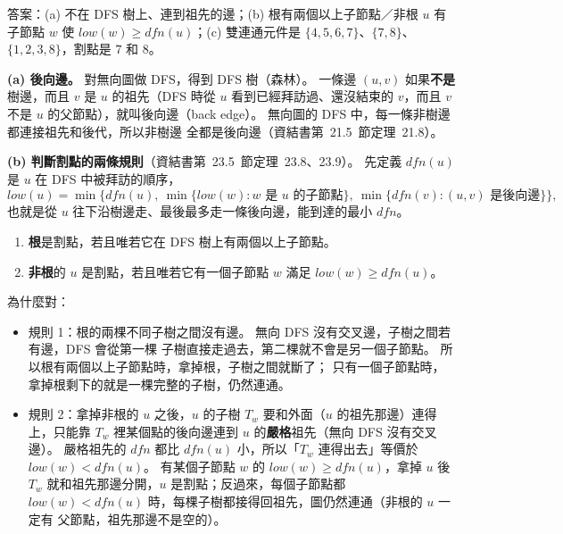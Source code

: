 \begin{pastsoln}
答案：(a) 不在 DFS 樹上、連到祖先的邊；(b) 根有兩個以上子節點／非根 $u$ 有子節點 $w$ 使
$\mathit{low}(w) \ge \mathit{dfn}(u)$；(c) 雙連通元件是 $\{4, 5, 6, 7\}$、$\{7, 8\}$、
$\{1, 2, 3, 8\}$，割點是 $7$ 和 $8$。

\textbf{(a) 後向邊。} 對無向圖做 DFS，得到 DFS 樹（森林）。 一條邊 $(u, v)$ 如果\textbf{不是}
樹邊，而且 $v$ 是 $u$ 的祖先（DFS 時從 $u$ 看到已經拜訪過、還沒結束的 $v$，而且 $v$ 不是 $u$
的父節點），就叫後向邊（back edge）。 無向圖的 DFS 中，每一條非樹邊都連接祖先和後代，所以非樹邊
全都是後向邊（資結書第~21.5~節定理~21.8）。

\textbf{(b) 判斷割點的兩條規則}（資結書第~23.5~節定理~23.8、23.9）。 先定義
$\mathit{dfn}(u)$ 是 $u$ 在 DFS 中被拜訪的順序，
\[
\mathit{low}(u) = \min\bigl\{\mathit{dfn}(u),\ \min\{\mathit{low}(w) : w \text{ 是 } u
\text{ 的子節點}\},\ \min\{\mathit{dfn}(v) : (u, v) \text{ 是後向邊}\}\bigr\},
\]
也就是從 $u$ 往下沿樹邊走、最後最多走一條後向邊，能到達的最小 $\mathit{dfn}$。
\begin{enumerate}[label=\arabic*.]
\item \textbf{根}是割點，若且唯若它在 DFS 樹上有兩個以上子節點。
\item \textbf{非根}的 $u$ 是割點，若且唯若它有一個子節點 $w$ 滿足
$\mathit{low}(w) \ge \mathit{dfn}(u)$。
\end{enumerate}

為什麼對：
\begin{itemize}
\item 規則 1：根的兩棵不同子樹之間沒有邊。 無向 DFS 沒有交叉邊，子樹之間若有邊，DFS 會從第一棵
子樹直接走過去，第二棵就不會是另一個子節點。 所以根有兩個以上子節點時，拿掉根，子樹之間就斷了；
只有一個子節點時，拿掉根剩下的就是一棵完整的子樹，仍然連通。
\item 規則 2：拿掉非根的 $u$ 之後，$u$ 的子樹 $T_w$ 要和外面（$u$ 的祖先那邊）連得上，只能靠
$T_w$ 裡某個點的後向邊連到 $u$ 的\textbf{嚴格}祖先（無向 DFS 沒有交叉邊）。 嚴格祖先的
$\mathit{dfn}$ 都比 $\mathit{dfn}(u)$ 小，所以「$T_w$ 連得出去」等價於
$\mathit{low}(w) < \mathit{dfn}(u)$。 有某個子節點 $w$ 的 $\mathit{low}(w) \ge
\mathit{dfn}(u)$，拿掉 $u$ 後 $T_w$ 就和祖先那邊分開，$u$ 是割點；反過來，每個子節點都
$\mathit{low}(w) < \mathit{dfn}(u)$ 時，每棵子樹都接得回祖先，圖仍然連通（非根的 $u$ 一定有
父節點，祖先那邊不是空的）。
\end{itemize}


\end{pastsoln}
